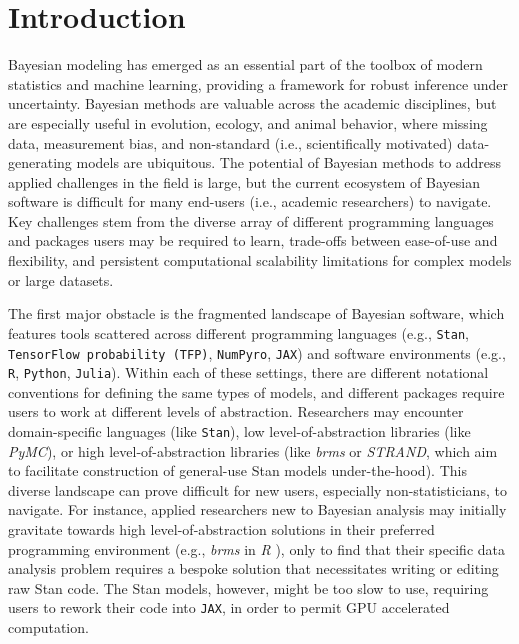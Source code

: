 \documentclass[blind,lineno,num-refs]{wiley-article}
\begin{document}
\section{Introduction}\label{introduction}

Bayesian modeling has emerged as an essential part of the toolbox of modern statistics and machine learning, providing a framework for robust inference under uncertainty. Bayesian methods are valuable across the academic disciplines, but are especially useful in evolution, ecology, and animal behavior, where missing data, measurement bias, and non-standard (i.e., scientifically motivated) data-generating models are ubiquitous. The potential of Bayesian methods to address applied challenges in the field is large, but the current ecosystem of Bayesian software is difficult for many end-users (i.e., academic researchers) to navigate. Key challenges stem from the diverse array of different programming languages and packages users may be required to learn, trade-offs between ease-of-use and flexibility, and persistent computational scalability limitations for complex models or large datasets.


The first major obstacle is the fragmented landscape of Bayesian software, which features tools scattered across different programming languages (e.g., \texttt{Stan}, \texttt{TensorFlow probability (TFP)}, \texttt{NumPyro}, \texttt{JAX}) and software environments (e.g., \texttt{R}, \texttt{Python}, \texttt{Julia}). Within each of these settings, there are different notational conventions for defining the same types of models, and different packages require users to work at different levels of abstraction. Researchers may encounter domain-specific languages (like \texttt{Stan}), low level-of-abstraction libraries (like \textit{PyMC}), or high level-of-abstraction libraries (like \textit{brms} or \textit{STRAND}, which aim to facilitate construction of general-use Stan models under-the-hood). This diverse landscape can prove difficult for new users, especially non-statisticians, to navigate. For instance, applied researchers new to Bayesian analysis may initially gravitate towards high level-of-abstraction solutions in their preferred programming environment (e.g., \textit{brms} \citep{BRMS} in \textit{R} \citep{R}), only to find that their specific data analysis problem requires a bespoke solution that necessitates writing or editing raw Stan code. The Stan models, however, might be too slow to use, requiring users to rework their code into \texttt{JAX}, in order to permit GPU accelerated computation.
\end{document}

